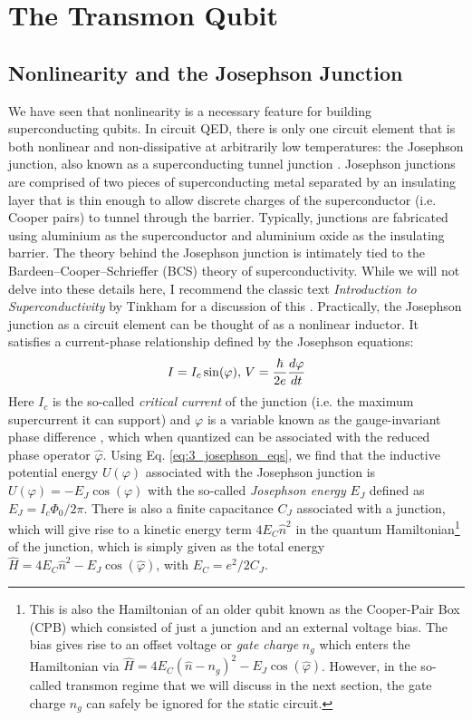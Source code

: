 \section{The Transmon Qubit}

\subsection{Nonlinearity and the Josephson Junction}

We have seen that nonlinearity is a necessary feature for building superconducting qubits. In circuit QED, there is only one circuit element that is both nonlinear and non-dissipative at arbitrarily low temperatures: the Josephson junction, also known as a superconducting tunnel junction \cite{devoret2004superconducting}. Josephson junctions are comprised of two pieces of superconducting metal separated by an insulating layer that is thin enough to allow discrete charges of the superconductor (i.e. Cooper pairs) to tunnel through the barrier. Typically,  junctions are fabricated using aluminium as the superconductor and aluminium oxide as the insulating barrier. The theory behind the Josephson junction is intimately tied to the Bardeen–Cooper–Schrieffer (BCS) theory of superconductivity. While we will not delve into these details here, I recommend the classic text \textit{Introduction to Superconductivity} by Tinkham for a discussion of this \cite{tinkham2004introduction}. Practically, the Josephson junction as a circuit element can be thought of as a nonlinear inductor. It satisfies a current-phase relationship defined by the Josephson equations:
\begin{equation}
    I = I_c \sin(\varphi), \, V = \frac{\hbar}{2e}\frac{d\varphi}{dt}
    \label{eq:3_josephson_eqs}
\end{equation}
Here $I_c$ is the so-called \textit{critical current} of the junction (i.e. the maximum supercurrent it can support) and $\varphi$ is a variable known as the gauge-invariant phase difference \cite{devoret2021does}, which when quantized can be associated with the reduced phase operator $\hat{\varphi}$. Using Eq. \eqref{eq:3_josephson_eqs}, we find that the inductive potential energy $U(\varphi)$ associated with the Josephson junction is $U(\varphi) = -E_J\cos(\varphi)$ with the so-called \textit{Josephson energy} $E_J$ defined as $E_J = I_c\Phi_0/2\pi$. There is also a finite capacitance $C_J$ associated with a junction, which will give rise to a kinetic energy term $4E_C\hat{n}^2$ in the quantum Hamiltonian\footnote{This is also the Hamiltonian of an older qubit known as the Cooper-Pair Box (CPB) which consisted of just a junction and an external voltage bias. The bias gives rise to an offset voltage or \textit{gate charge} $n_g$ which enters the Hamiltonian via $\hat{H} = 4E_C(\hat{n}-n_g)^2 - E_J\cos(\hat{\varphi})$. However, in the so-called transmon regime that we will discuss in the next section, the gate charge $n_g$ can safely be ignored for the static circuit. } of the junction, which is simply given as the total energy $\hat{H} = 4E_C\hat{n}^2 - E_J\cos(\hat{\varphi})$, with $E_C = e^2/2C_J$. 

